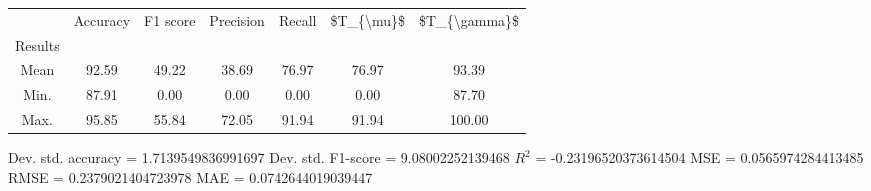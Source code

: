 \begin{tabular}{|c|c|c|c|c|c|c|}
\toprule
{} &  Accuracy &  F1 score &  Precision &  Recall &  \$T\_\{\textbackslash mu\}\$ &  \$T\_\{\textbackslash gamma\}\$ \\
Results &           &           &            &         &            &               \\
\hline
Mean    &     92.59 &     49.22 &      38.69 &   76.97 &      76.97 &         93.39 \\
Min.    &     87.91 &      0.00 &       0.00 &    0.00 &       0.00 &         87.70 \\
Max.    &     95.85 &     55.84 &      72.05 &   91.94 &      91.94 &        100.00 \\
\bottomrule
\end{tabular}

 Dev. std. accuracy = 1.7139549836991697
 Dev. std. F1-score = 9.08002252139468
 $R^2$ = -0.23196520373614504
 MSE = 0.0565974284413485
 RMSE = 0.2379021404723978
 MAE = 0.0742644019039447